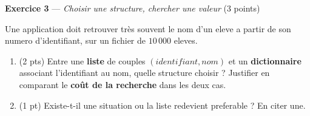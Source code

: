 %
%

\bigskip

\textbf{Exercice 3} --- \textit{Choisir une structure, chercher une valeur} \hfill (3 points)

Une application doit retrouver très souvent le nom d'un eleve a partir de son numero
d'identifiant, sur un fichier de $10\,000$ eleves.

\begin{enumerate}
  \item (2 pts) Entre une \textbf{liste} de couples $(identifiant, nom)$ et un
  \textbf{dictionnaire} associant l'identifiant au nom, quelle structure choisir ? Justifier
  en comparant le \textbf{coût de la recherche} dans les deux cas.
  \item (1 pt) Existe-t-il une situation ou la liste redevient preferable ? En citer une.
\end{enumerate}

%
%

